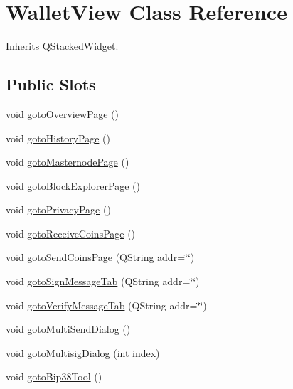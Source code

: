 \hypertarget{class_wallet_view}{}\section{Wallet\+View Class Reference}
\label{class_wallet_view}


Inherits Q\+Stacked\+Widget.

\subsection*{Public Slots}
\begin{DoxyCompactItemize}
\item 
void \mbox{\hyperlink{class_wallet_view_ac9065162b1cf4700f733d1fb119bd973}{goto\+Overview\+Page}} ()
\item 
void \mbox{\hyperlink{class_wallet_view_a04b97e2623ac678e92111f1db14fde83}{goto\+History\+Page}} ()
\item 
void \mbox{\hyperlink{class_wallet_view_a0cdc8766e5d590b18338d23c226e5565}{goto\+Masternode\+Page}} ()
\item 
void \mbox{\hyperlink{class_wallet_view_a7a537efdf362fbbe43098eb147362159}{goto\+Block\+Explorer\+Page}} ()
\item 
void \mbox{\hyperlink{class_wallet_view_a69e62e77e7a4b9fc4c43b07d41b04600}{goto\+Privacy\+Page}} ()
\item 
void \mbox{\hyperlink{class_wallet_view_a55ebee0d484c3ada114197050ec417db}{goto\+Receive\+Coins\+Page}} ()
\item 
void \mbox{\hyperlink{class_wallet_view_a2a70c2b00b097dd7b83b6915bb037ea3}{goto\+Send\+Coins\+Page}} (Q\+String addr=\char`\"{}\char`\"{})
\item 
void \mbox{\hyperlink{class_wallet_view_a6443ddcb872a1743a61102a3dcd2d560}{goto\+Sign\+Message\+Tab}} (Q\+String addr=\char`\"{}\char`\"{})
\item 
void \mbox{\hyperlink{class_wallet_view_a0a23aaaf87d3aec5ae8b1b8320d66796}{goto\+Verify\+Message\+Tab}} (Q\+String addr=\char`\"{}\char`\"{})
\item 
void \mbox{\hyperlink{class_wallet_view_abddf68fced738b62ad65d4e86ef54c4c}{goto\+Multi\+Send\+Dialog}} ()
\item 
void \mbox{\hyperlink{class_wallet_view_a73b3738ee4714ac1f461bfa84a249ab9}{goto\+Multisig\+Dialog}} (int index)
\item 
void \mbox{\hyperlink{class_wallet_view_adeeea711b11aaaaedeba5cb4500fd3d1}{goto\+Bip38\+Tool}} ()
\item 

\end{DoxyCompactItemize}
